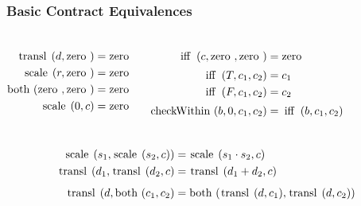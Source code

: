 \documentclass[xcolor=dvipsnames,11pt]{beamer}
\newcommand{\ttt}[1]{\mbox{\cd{#1}~}}
\newcommand{\zero}{\ttt{zero}}
\newcommand{\scale}{\ttt{scale}}
\newcommand{\transl}{\ttt{transl}}
\newcommand{\both}{\ttt{both}}
\newcommand{\ifff}{\ttt{iff}}
\newcommand{\checkWithin}{\ttt{checkWithin}}
\begin{document}
\begin{frame}\frametitle{Basic Contract Equivalences}{\footnotesize

\begin{columns}
\begin{align*}
    \transl(d,\zero)             &=  \zero\\
    \scale(r,\zero)              &=  \zero\\
    \both(\zero,\zero)           &=  \zero\\
    \scale(0,c)                  &=  \zero\\
\end{align*}

\begin{align*}
    \ifff(c,\zero,\zero)        &= \zero\\[0.5ex]
    \ifff(T,c_1,c_2)            &=  c_1\\
    \ifff(F,c_1,c_2)            &=  c_2\\[0.5ex]
    \checkWithin(b,0,c_1,c_2)   &= \ifff(b,c_1,c_2) \\
\end{align*}
\end{columns}

\begin{align*}
    \scale(s_1,\scale(s_2,c))    &=  \scale(s_1\cdot s_2,c)\\
    \transl(d_1,\transl(d_2,c)   &=  \transl(d_1+d_2,c)\\[1ex]
    \transl(d,\both(c_1,c_2)     &=  \both(\transl(d,c_1),\transl(d,c_2))\\[1ex]
\end{align*}

}
\end{frame}
\end{document}
